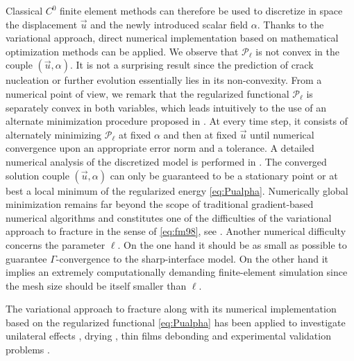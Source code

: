 Classical $C^0$ finite element methods can therefore be used to discretize in space the displacement $\vec{u}$ and the newly introduced scalar field $\alpha$. Thanks to the variational approach, direct numerical implementation based on mathematical optimization methods can be applied. We observe that $\mathcal{P}_\ell$ is not convex in the couple $(\vec{u},\alpha)$. It is not a surprising result since the prediction of crack nucleation or further evolution essentially lies in its non-convexity. From a numerical point of view, we remark that the regularized functional $\mathcal{P}_\ell$ is separately convex in both variables, which leads intuitively to the use of an alternate minimization procedure proposed in \cite{BourdinFrancfortMarigo:2000}. At every time step, it consists of alternately minimizing $\mathcal{P}_\ell$ at fixed $\alpha$ and then at fixed $\vec{u}$ until numerical convergence upon an appropriate error norm and a tolerance. A detailed numerical analysis of the discretized model is performed in \cite{BourdinFrancfortMarigo:2008}. The converged solution couple $(\vec{u},\alpha)$ can only be guaranteed to be a stationary point or at best a local minimum of the regularized energy \eqref{eq:Pualpha}. Numerically global minimization remains far beyond the scope of traditional gradient-based numerical algorithms and constitutes one of the difficulties of the variational approach to fracture in the sense of \eqref{eq:fm98}, see \cite{BourdinFrancfortMarigo:2008}. Another numerical difficulty concerns the parameter $\ell$. On the one hand it should be as small as possible to guarantee $\Gamma$-convergence to the sharp-interface model. On the other hand it implies an extremely computationally demanding finite-element simulation since the mesh size should be itself smaller than $\ell$.

The variational approach to fracture along with its numerical implementation based on the regularized functional \eqref{eq:Pualpha} has been applied to investigate unilateral effects \cite{PieroLancioniMarch:2007,AmorMarigoMaurini:2009}, drying \cite{MauriniBourdinGauthierLazarus:2013}, thin films debonding \cite{Baldelli:2014} and experimental validation problems \cite{MesgarnejadBourdinKhonsari:2014}.

